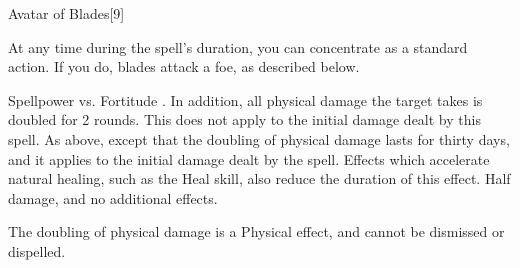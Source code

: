 \begin{spellsection}{Avatar of Blades}[9]
    \begin{spellheader}
    \end{spellheader}
    \begin{spellcontent}
        \begin{spelltargetinginfo}
        \end{spelltargetinginfo}
        \begin{spelleffects}
            \spelleffect At any time during the spell's duration, you can concentrate as a standard action. If you do, blades attack a foe, as described below.
            \spelldur \durlong
        \end{spelleffects}
    \end{spellcontent}
    \begin{spellsubcontent}
        \begin{spelltargetinginfo}
        \end{spelltargetinginfo}
        \begin{spelleffects}
            \begin{spellattack}{Spellpower vs. Fortitude}
                \spellsuccess {}. In addition, all physical damage the target takes is doubled for 2 rounds.
                This does not apply to the initial damage dealt by this spell.
                \spellcritical As above, except that the doubling of physical damage lasts for thirty days, and it applies to the initial damage dealt by the spell.
                Effects which accelerate natural healing, such as the Heal skill, also reduce the duration of this effect.
                \spellfailure Half damage, and no additional effects.
            \end{spellattack}
        \end{spelleffects}
    \end{spellsubcontent}
    \begin{spellfooter}
        \spellnotes The doubling of physical damage is a Physical effect, and cannot be dismissed or dispelled.
        \miscastexplode
    \end{spellfooter}
\end{spellsection}

